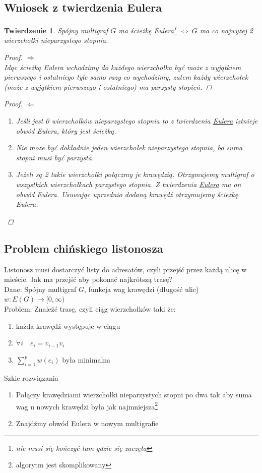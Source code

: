 \documentclass[12pt,a4paper]{article}
\newtheorem{tw}{Twierdzenie}
\theoremstyle{definition}
\begin{document}
\subsection{Wniosek z twierdzenia Eulera}
\begin{tw}
Spójny multigraf $G$ ma ścieżkę Eulera\footnote{nie musi się kończyć tam gdzie się zaczęła} $\Leftrightarrow~ G$ ma co najwyżej 2 wierzchołki nieparzystego stopnia.
\begin{proof}
$\Rightarrow$\\
Idąc ścieżką Eulera wchodzimy do każdego wierzchołka być może z wyjątkiem pierwszego i ostatniego tyle samo razy co wychodzimy, zatem każdy wierzchołek (może z wyjątkiem pierwszego i ostatniego) ma parzysty stopień.
\end{proof} 
\begin{proof}
$\Leftarrow$
	\begin{enumerate}
		\item Jeśli jest 0 wierzchołków nieparzystego stopnia to z twierdzenia \hyperref[tw:Eulera]{Eulera} istnieje obwód Eulera, który jest ścieżką.
		\item Nie może być dokładnie jeden wierzchołek nieparzystego stopnia, bo suma stopni musi być parzysta.
		\item Jeżeli są 2 takie wierzchołki połączmy je krawędzią. Otrzymujemy multigraf o wszystkich wierzchołkach parzystego stopnia. Z twierdzenia \hyperref[tw:Eulera]{Eulera} ma on obwód Eulera. Usuwając uprzednio dodaną krawędź otrzymujemy ścieżkę  Eulera.
	\end{enumerate}
\end{proof}
\end{tw}

\subsection{Problem chińskiego listonosza}
Listonosz musi dostarczyć listy do adresatów, czyli przejść przez każdą ulicę w mieście. Jak ma przejść aby pokonać najkrótszą trasę?\\
Dane: Spójny multigraf $G$, funkcja wag krawędzi (długość ulic) $w : E(G) \to [0,\infty)$\\
Problem: Znaleźć trasę, czyli ciąg wierzchołków taki że:
\begin{enumerate}
	\item każda krawędź występuje w ciągu
	\item $\forall i \quad e_i = v_{i-1}v_i$
	\item $\sum\limits_{i=1}^{p} w(e_i)$ była minimalna 
\end{enumerate}
Szkic rozwiązania
\begin{enumerate}
	\item Połączy krawędziami wierzchołki nieparzystych stopni po dwa tak aby suma wag u nowych krawędzi była jak najmniejsza\footnote{algorytm jest skomplikowany}
	\item Znajdźmy obwód Eulera w nowym multigrafie
\end{enumerate}
\end{document}
